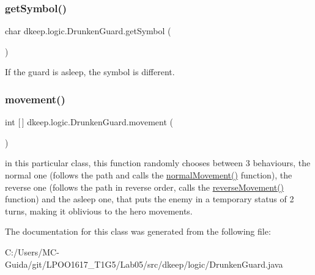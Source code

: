 \subsubsection{\texorpdfstring{get\+Symbol()}{getSymbol()}}
{\footnotesize\ttfamily char dkeep.\+logic.\+Drunken\+Guard.\+get\+Symbol (\begin{DoxyParamCaption}{ }\end{DoxyParamCaption})}

If the guard is asleep, the symbol is different. \mbox{\label{classdkeep_1_1logic_1_1_drunken_guard_ade9c30f28e40df9049472a5807c2b79e}} 
\subsubsection{\texorpdfstring{movement()}{movement()}}
{\footnotesize\ttfamily int \mbox{[}$\,$\mbox{]} dkeep.\+logic.\+Drunken\+Guard.\+movement (\begin{DoxyParamCaption}{ }\end{DoxyParamCaption})}

in this particular class, this function randomly chooses between 3 behaviours, the normal one (follows the path and calls the \hyperlink{classdkeep_1_1logic_1_1_guard_a2389016085c6d65d4366930fac72dab4}{normal\+Movement()} function), the reverse one (follows the path in reverse order, calls the \hyperlink{classdkeep_1_1logic_1_1_guard_a8c588aa887fcfe6d3e4a9e13d236c644}{reverse\+Movement()} function) and the asleep one, that puts the enemy in a temporary status of 2 turns, making it oblivious to the hero movements. 

The documentation for this class was generated from the following file\+:\begin{DoxyCompactItemize}
\item 
C\+:/\+Users/\+M\+C-\/\+Guida/git/\+L\+P\+O\+O1617\+\_\+\+T1\+G5/\+Lab05/src/dkeep/logic/Drunken\+Guard.\+java\end{DoxyCompactItemize}
